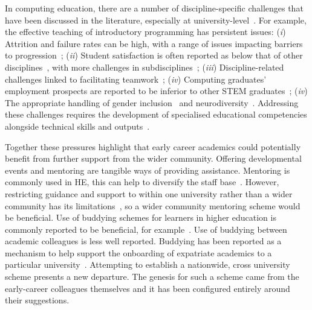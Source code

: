 \documentclass[sigconf]{acmart}
\begin{document}
In computing education, there are a number of discipline-specific
challenges that have been discussed in the literature, especially at
university-level~\cite{davenport-et-al:latice2016,murphy-et-al:programming2017,simon-et-al:sigcse2018}. For
example, the effective teaching of introductory programming has
persistent issues: ({\emph{i}}) Attrition and failure rates can be
high, with a range of issues impacting barriers to
progression~\cite{Watson:2014:FRI:2591708.2591749,davenport-et-al:educon2020};
({\emph{ii}}) Student satisfaction is often reported as below that of
other disciplines~\cite{Sinclair2015}, with more challenges in
subdisciplines~\cite{Knutas2021}; ({\emph{iii}}) Discipline-related
challenges linked to facilitating
teamwork~\cite{Gordon2010,Phillips2021}; ({\emph{iv}}) Computing
graduates' employment prospects are reported to be inferior to other
STEM graduates~\cite{shadbolt2016shadbolt,crick-et-al:fie2019};
({\emph{iv}}) The appropriate handling of gender
inclusion~\cite{Winter2021} and
neurodiversity~\cite{Stuurman2109}. Addressing these challenges
requires the development of specialised educational competencies
alongside technical skills and
outputs~\cite{phillips-et-al:educon2021}.

Together these pressures highlight that early career academics could
potentially benefit from further support from the wider
community. Offering developmental events and mentoring are tangible
ways of providing assistance. Mentoring is commonly used in HE, this
can help to diversify the staff base~\cite{Golubchik2018}. However,
restricting guidance and support to within one university rather than
a wider community has its limitations~\cite{Golubchik2018}, so a wider
community mentoring scheme would be beneficial. Use of buddying
schemes for learners in higher education is commonly reported to be
beneficial, for example~\cite{Hayes2020,May20}. Use of buddying
between academic colleagues is less well reported. Buddying has been
reported as a mechanism to help support the onboarding of expatriate
academics to a particular university~\cite{Wilkins2019}. Attempting to
establish a nationwide, cross university scheme presents a new
departure. The genesis for such a scheme came from the early-career
colleagues themselves and it has been configured entirely around their
suggestions.
\end{document}
